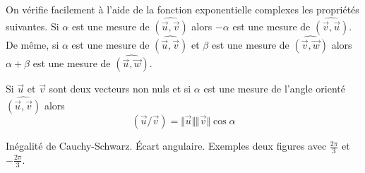 On vérifie facilement à l'aide de la fonction exponentielle complexes les propriétés suivantes. Si $\alpha$ est une mesure de $\widehat{(\overrightarrow{u},\overrightarrow{v})}$ alors $-\alpha$ est une mesure de $\widehat{(\overrightarrow{v},\overrightarrow{u})}$. De même, si $\alpha$ est une mesure de $\widehat{(\overrightarrow{u},\overrightarrow{v})}$ et $\beta$ est une mesure de $\widehat{(\overrightarrow{v},\overrightarrow{w})}$ alors $\alpha + \beta$ est une mesure de $\widehat{(\overrightarrow{u},\overrightarrow{w})}$.
\begin{prop}
 Si $\overrightarrow u$ et $\overrightarrow v$ sont deux vecteurs non nuls et si $\alpha$ est une mesure de l'angle orienté $\widehat{(\overrightarrow{u},\overrightarrow{v})}$ alors
\begin{displaymath}
 (\overrightarrow{u}/\overrightarrow{v}) = \Vert\overrightarrow{u}\Vert \Vert\overrightarrow{v}\Vert \cos \alpha
\end{displaymath}
\end{prop}
Inégalité de Cauchy-Schwarz. \'Ecart angulaire. Exemples deux figures avec $\frac{2\pi}{3}$ et $-\frac{2\pi}{3}$.

